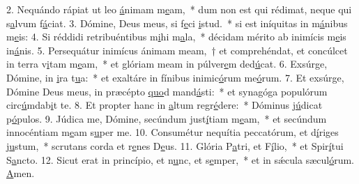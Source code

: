 2. Nequándo rápiat ut leo \uline{á}nimam m\uline{e}am,~* dum non est qui rédimat, neque qui s\uline{a}lvum f\uline{á}ciat.
3. Dómine, Deus meus, si f\uline{e}ci \uline{i}stud.~* si est iníquitas in m\uline{á}nibus m\uline{e}is:
4. Si réddidi retribuéntibus m\uline{i}hi m\uline{a}la,~* décidam mérito ab inimícis m\uline{e}is in\uline{á}nis.
5. Persequátur inimícus ánimam meam,~† et comprehéndat, et concúlcet in terra v\uline{i}tam m\uline{e}am,~* et glóriam meam in púlver\uline{e}m ded\uline{ú}cat.
6. Exsúrge, Dómine, in \uline{i}ra t\uline{u}a:~* et exaltáre in fínibus inimic\uline{ó}rum me\uline{ó}rum.
7. Et exsúrge, Dómine Deus meus, in præcépto \uline{quo}d mand\uline{á}sti:~* et synagóga populórum circ\uline{ú}mdab\uline{i}t te.
8. Et propter hanc in \uline{a}ltum regr\uline{é}dere:~* Dóminus j\uline{ú}dicat p\uline{ó}pulos.
9. Júdica me, Dómine, secúndum just\uline{í}tiam m\uline{e}am,~* et secúndum innocéntiam m\uline{e}am s\uline{u}per me.
10. Consumétur nequítia peccatórum, et d\uline{í}riges j\uline{u}stum,~* scrutans corda et r\uline{e}nes D\uline{e}us.
11. Glória P\uline{a}tri, et F\uline{í}lio,~* et Spir\uline{í}tui S\uline{a}ncto.
12. Sicut erat in princípio, et n\uline{u}nc, et s\uline{e}mper,~* et in sǽcula sæcul\uline{ó}rum. \uline{A}men.
